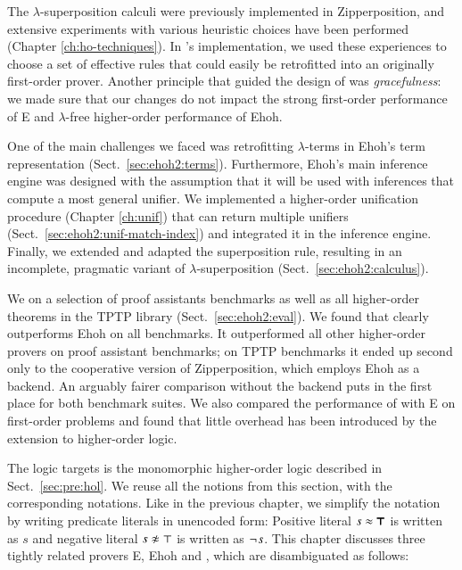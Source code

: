 %
The $\lambda$-superposition calculi were
previously implemented in Zipperposition, and
extensive experiments with various heuristic choices have been performed
(Chapter \ref{ch:ho-techniques}). In \ehohii{}'s implementation, we used
these experiences to choose a set of effective rules that could easily be
retrofitted into an originally first-order prover. Another principle that guided 
the design of \ehohii{} was \emph{gracefulness}: we made sure that our changes
do not impact the strong first-order performance of E and $\lambda$-free higher-order performance of Ehoh. 


One of the main challenges we faced was retrofitting $\lambda$-terms in Ehoh's
term representation (Sect.~\ref{sec:ehoh2:terms}). Furthermore, Ehoh's main inference
engine was designed with the assumption that it will be used with
inferences that compute a most general unifier. We
implemented a higher-order unification procedure (Chapter \ref{ch:unif})
that can return multiple unifiers (Sect.~\ref{sec:ehoh2:unif-match-index}) and
integrated it in the inference engine. Finally, we extended and adapted the
superposition rule, resulting in an incomplete, pragmatic variant of
$\lambda$-superposition (Sect.~\ref{sec:ehoh2:calculus}).

We  \ehohii{} on a selection of proof assistants benchmarks
as well as all higher-order theorems in the TPTP library \cite{gs-17-tptp}
(Sect.~\ref{sec:ehoh2:eval}). We found
that \ehohii{} clearly outperforms Ehoh on all benchmarks. It outperformed all other higher-order provers on
proof assistant benchmarks; on TPTP benchmarks it ended up second only 
to the cooperative version of Zipperposition, which employs Ehoh as a
backend. An arguably fairer comparison without the backend puts \ehohii{} in the
first place for both benchmark suites.
We also compared the performance of \ehohii{} with E on first-order
problems and found that little overhead has been introduced by the
extension to higher-order logic.

 The logic \ehohii{} targets is the monomorphic higher-order
logic described in Sect.~\ref{sec:pre:hol}. We reuse all the notions from this
section, with the corresponding notations. Like in the previous chapter, we
simplify the notation by writing predicate literals in unencoded form: Positive
literal $s \approx \pmb{\top}$ is written as $s$ and negative literal
$\neqlit{s}{\top}$ is written as $\neg{\kern.2ex s}$.   This chapter discusses
three tightly related provers E, Ehoh and \ehohii{}, which are disambiguated as
follows:

